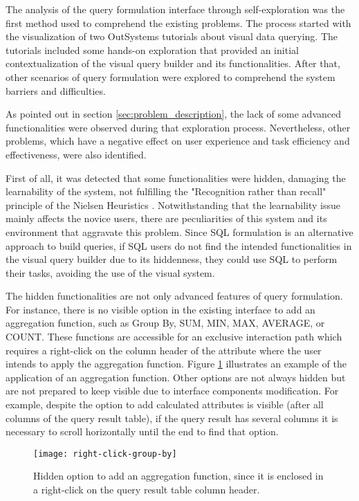 The analysis of the query formulation interface through self-exploration was the first method used to comprehend the existing problems. The process started with the visualization of two OutSystems tutorials \cite{outsystems_tutorial_aggregates_101, outsystems_tutorial_advanced_aggregates} about visual data querying. The tutorials included some hands-on exploration that provided an initial contextualization of the visual query builder and its functionalities. After that, other scenarios of query formulation were explored to comprehend the system barriers and difficulties.

As pointed out in section \ref{sec:problem_description}, the lack of some advanced functionalities were observed during that exploration process. Nevertheless, other problems, which have a negative effect on user experience and task efficiency and effectiveness, were also identified.

First of all, it was detected that some functionalities were hidden, damaging the learnability of the system, not fulfilling the "Recognition rather than recall" principle of the Nielsen Heuristics \cite{nielsen_heuristics}. Notwithstanding that the learnability issue mainly affects the novice users, there are peculiarities of this system and its environment that aggravate this problem. Since SQL formulation is an alternative approach to build queries, if SQL users do not find the intended functionalities in the visual query builder due to its hiddenness, they could use SQL to perform their tasks, avoiding the use of the visual system.

The hidden functionalities are not only advanced features of query formulation. For instance, there is no visible option in the existing interface to add an aggregation function, such as Group By, SUM, MIN, MAX, AVERAGE, or COUNT. These functions are accessible for an exclusive interaction path which requires a right-click on the column header of the attribute where the user intends to apply the aggregation function. Figure \ref{fig:rightClickGroupBy} illustrates an example of the application of an aggregation function. Other options are not always hidden but are not prepared to keep visible due to interface components modification. For example, despite the option to add calculated attributes is visible (after all columns of the query result table), if the query result has several columns it is necessary to scroll horizontally until the end to find that option.

\begin{figure}[htbp]
	\centering
	\texttt{[image: right-click-group-by]}
	\caption{Hidden option to add an aggregation function, since it is enclosed in a right-click on the query result table column header.}
	\label{fig:rightClickGroupBy}
\end{figure}


